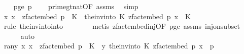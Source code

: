 \begin{isabellebody}
\isanewline
\ \ \isamarkupfalse%
\ p{\isacharunderscore}{\kern0pt}ge{\isacharunderscore}{\kern0pt}{}{\isacharcolon}{\kern0pt}\ {\isachardoublequoteopen}p\ {\isachargreater}{\kern0pt}\ {}{\isachardoublequoteclose}\ \isamarkupfalse%
\ prime{\isacharunderscore}{\kern0pt}gt{\isacharunderscore}{\kern0pt}{}{\isacharunderscore}{\kern0pt}nat{\isacharbrackleft}{\kern0pt}OF\ assms{\isacharparenleft}{\kern0pt}{}{\isacharparenright}{\kern0pt}{\isacharbrackright}{\kern0pt}\ \isamarkupfalse%
\ simp\isanewline
\isanewline
\ \ \isamarkupfalse%
\ {\isachardoublequoteopen}{\isasymAnd}x{\isachardot}{\kern0pt}\ x\ {\isasymin}\ zfact{\isacharunderscore}{\kern0pt}embed\ p\ {\isacharbackquote}{\kern0pt}\ K\ {\isasymLongrightarrow}\ the{\isacharunderscore}{\kern0pt}inv{\isacharunderscore}{\kern0pt}into\ K\ {\isacharparenleft}{\kern0pt}zfact{\isacharunderscore}{\kern0pt}embed\ p{\isacharparenright}{\kern0pt}\ x\ {\isasymin}\ K{\isachardoublequoteclose}\isanewline
\ \ \ \ \isamarkupfalse%
\ {\isacharparenleft}{\kern0pt}rule\ the{\isacharunderscore}{\kern0pt}inv{\isacharunderscore}{\kern0pt}into{\isacharunderscore}{\kern0pt}into{\isacharparenright}{\kern0pt}\isanewline
\ \ \ \ \ \ \isamarkupfalse%
\ {\isacharparenleft}{\kern0pt}metis\ zfact{\isacharunderscore}{\kern0pt}embed{\isacharunderscore}{\kern0pt}inj{\isacharbrackleft}{\kern0pt}OF\ p{\isacharunderscore}{\kern0pt}ge{\isacharunderscore}{\kern0pt}{}{\isacharbrackright}{\kern0pt}\ assms{\isacharparenleft}{\kern0pt}{}{\isacharparenright}{\kern0pt}\ inj{\isacharunderscore}{\kern0pt}on{\isacharunderscore}{\kern0pt}subset{\isacharparenright}{\kern0pt}\isanewline
\ \ \ \ \isamarkupfalse%
\ auto\isanewline
\isanewline
\ \ \isamarkupfalse%
\ ran{\isacharunderscore}{\kern0pt}y{\isacharcolon}{\kern0pt}\ {\isachardoublequoteopen}{\isasymAnd}x{\isachardot}{\kern0pt}\ x\ {\isasymin}\ zfact{\isacharunderscore}{\kern0pt}embed\ p\ {\isacharbackquote}{\kern0pt}\ K\ {\isasymLongrightarrow}\ y\ {\isacharparenleft}{\kern0pt}the{\isacharunderscore}{\kern0pt}inv{\isacharunderscore}{\kern0pt}into\ K\ {\isacharparenleft}{\kern0pt}zfact{\isacharunderscore}{\kern0pt}embed\ p{\isacharparenright}{\kern0pt}\ x{\isacharparenright}{\kern0pt}\ {\isasymin}\ {\isacharbraceleft}{\kern0pt}{}{\isachardot}{\kern0pt}{\isachardot}{\kern0pt}{\isacharless}{\kern0pt}p{\isacharbraceright}{\kern0pt}{\isachardoublequoteclose}\isanewline
\ \ \ \ \isamarkupfalse%

\end{isabellebody}
